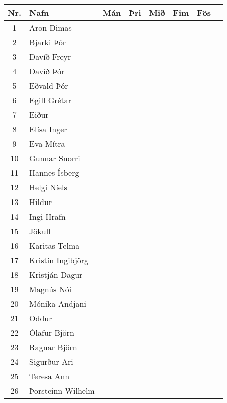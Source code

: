 \begin{table}[H]
    \centering
    \begin{tabular}{|c|l|c|c|c|c|c|c|}
    \hline 
    \textbf{Nr.} & \textbf{Nafn} & \textbf{Mán} & \textbf{Þri} & \textbf{Mið} & \textbf{Fim} & \textbf{Fös} \\ \hline \hline
       1 & Aron Dimas  & & & & &  \\ \hline
       2 & Bjarki Þór & & & & &   \\ \hline
       3 & Davíð Freyr & & & & &  \\ \hline
       4 & Davíð Þór & & & & &  \\ \hline
       5 & Eðvald Þór & & & & &  \\ \hline
       6 & Egill Grétar & & & & &  \\ \hline
       7 & Eiður & & & & &  \\ \hline
       8 & Elísa Inger & & & & &  \\ \hline
       9 & Eva Mítra & & & & &  \\ \hline
       10 & Gunnar Snorri & & & & &  \\ \hline
       11 & Hannes Ísberg & & & & &  \\ \hline
       12 & Helgi Níels & & & & &  \\ \hline
       13 & Hildur & & & & &  \\ \hline
       14 & Ingi Hrafn & & & & &  \\ \hline
       15 & Jökull & & & & &  \\ \hline
       16 & Karitas Telma & & & & &  \\ \hline
       17 & Kristín Ingibjörg & & & & &  \\ \hline
       18 & Kristján Dagur & & & & &  \\ \hline
       19 & Magnús Nói & & & & &  \\ \hline
       20 & Mónika Andjani & & & & &  \\ \hline
       21 & Oddur & & & & &  \\ \hline
       22 & Ólafur Björn & & & & &  \\ \hline
       23 & Ragnar Björn & & & & &  \\ \hline
       24 & Sigurður Ari & & & & &  \\ \hline
       25 & Teresa Ann & & & & &  \\ \hline
       26 & Þorsteinn Wilhelm & & & & &  \\ \hline
    \end{tabular}
\end{table}

